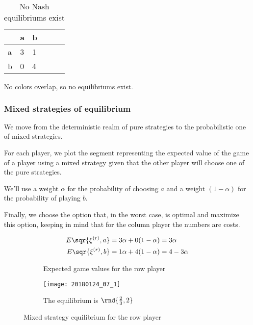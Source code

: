 \documentclass[\main/main.tex]{subfiles}
\begin{document}
\begin{table}
	\begin{tabular}{L|LLLLL}
		  & a                      & b                     \\
		\hline
		a &  3 & 1   \\
		b & 0    & 4
	\end{tabular}
	\caption{No Nash equilibriums exist}
\end{table}

No colors overlap, so no equilibriums exist.

\subsubsection*{Mixed strategies of equilibrium}
We move from the deterministic realm of pure strategies to the probabilistic one of mixed strategies.

For each player, we plot the segment representing the expected value of the game of a player using a mixed strategy given that the other player will choose one of the pure strategies.

We'll use a weight $\alpha$ for the probability of choosing $a$ and a weight $(1-\alpha)$ for the probability of playing $b$.

Finally, we choose the option that, in the worst case, is optimal and maximize this option, keeping in mind that for the column player the numbers are costs.

\begin{figure}
	\begin{subfigure}{0.49\textwidth}
		\begin{align*}
			E\sqr{\xi^{(r)}, a} & = 3\alpha + 0(1-\alpha) = 3\alpha    \\
			E\sqr{\xi^{(r)}, b} & = 1\alpha + 4(1-\alpha) = 4 -3\alpha
		\end{align*}
		\caption{Expected game values for the row player}
	\end{subfigure}
	\begin{subfigure}{0.49\textwidth}
		\texttt{[image: 20180124\_07\_1]}
		\caption{The equilibrium is $\rnd{\frac{2}{3}, 2}$}
	\end{subfigure}
	\caption{Mixed strategy equilibrium for the row player}
\end{figure}
\end{document}

